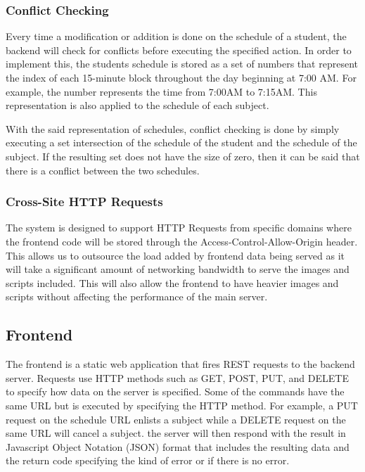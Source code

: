 \documentclass{sigchi}
\begin{document}
\subsubsection{Conflict Checking}

Every time a modification or addition is done on the schedule of a student, the backend will check for conflicts before executing the specified action. In order to implement this, the students schedule is stored as a set of numbers that represent the index of each 15-minute block throughout the day beginning at 7:00 AM. For example, the number represents the time from 7:00AM to 7:15AM. This representation is also applied to the schedule of each subject. 

With the said representation of schedules, conflict checking is done by simply executing a set intersection of the schedule of the student and the schedule of the subject. If the resulting set does not have the size of zero, then it can be said that there is a conflict between the two schedules.

\subsubsection{Cross-Site HTTP Requests}

The system is designed to support HTTP Requests from specific domains
where the frontend code will be stored through the Access-Control-Allow-Origin header. 
This allows us to outsource the load added by frontend data being served as 
it will take a significant amount of networking bandwidth to serve the images and
scripts included. This will also allow the frontend to have heavier images and 
scripts without affecting the performance of the main server. 

\subsection{Frontend}

The frontend is a static web application that fires REST requests to the
backend server. Requests use HTTP methods such as GET, POST, PUT, and DELETE to 
specify how data on the server is specified. Some of the commands have the same URL
but is executed by specifying the HTTP method. For example, a PUT request on the schedule
URL enlists a subject while a DELETE request on the same URL will cancel a subject. the
server will then respond with the result in Javascript Object Notation (JSON) format that
includes the resulting data and the return code specifying the kind of error or if there is
no error.
\end{document}

